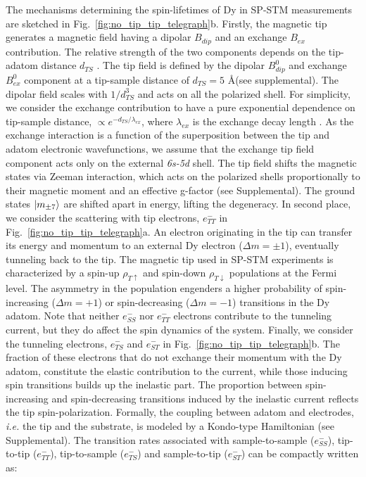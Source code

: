 \documentclass[
reprint,amsmath,amssymb,aps]{revtex4-2}
\begin{document}
The mechanisms determining the spin-lifetimes of Dy in SP-STM measurements are sketched in Fig.~\ref{fig:no_tip_tip_telegraph}b.
Firstly, the magnetic tip generates a magnetic field having a dipolar $B_{dip}$ and an exchange $B_{ex}$ contribution. The relative strength of the two components depends on the tip-adatom distance $d_{TS}$ \cite{willke}. 
The tip field is defined by the dipolar $B^0_{dip}$ and exchange $B^0_{ex}$ component at a tip-sample distance of $d_{TS}=5$ \AA (see supplemental). The dipolar field scales with $1/d_{TS}^3$ and acts on all the polarized shell. For simplicity, we consider the exchange contribution to have a pure exponential dependence on tip-sample distance, $\propto e^{-d_{TS}/\lambda_{ex}}$, where $\lambda_{ex}$ is the exchange decay length \cite{}.
As the exchange interaction is a function of the superposition between the tip and adatom electronic wavefunctions, we assume that the exchange tip field component acts only on the external \textit{6s-5d} shell.
The tip field shifts the magnetic states via Zeeman interaction, which acts on the polarized shells proportionally to their magnetic moment and an effective g-factor (see Supplemental). 
The ground states $\ket{m_{\pm7}}$  are shifted apart in energy, lifting the degeneracy. In second place, we consider the scattering with tip electrons, $e^{-}_{TT}$ in Fig.~\ref{fig:no_tip_tip_telegraph}a. An electron originating in the tip can transfer its energy and momentum to an external Dy electron ($\Delta m=\pm 1$), eventually tunneling back to the tip. The magnetic tip used in SP-STM experiments is characterized by a spin-up $\rho_{T\uparrow}$ and spin-down $\rho_{T\downarrow}$ populations at the Fermi level. The asymmetry in the population engenders a higher probability of spin-increasing ($\Delta m=+1$) or spin-decreasing ($\Delta m=-1$) transitions in the Dy adatom. Note that neither $e^{-}_{SS}$ nor $e^{-}_{TT}$ electrons contribute to the tunneling current, but they do affect the spin dynamics of the system. Finally, we consider the tunneling electrons, $e^{-}_{TS}$ and $e^{-}_{ST}$ in Fig.~\ref{fig:no_tip_tip_telegraph}b. The fraction of these electrons that do not exchange their momentum with the Dy adatom, constitute the elastic contribution to the current, while those inducing spin transitions builds up the inelastic part. The proportion between spin-increasing and spin-decreasing transitions induced by the inelastic current reflects the tip spin-polarization. Formally, the coupling between adatom and electrodes, \textit{i.e.} the tip and the substrate, is modeled by a Kondo-type Hamiltonian \cite{delgado2010} (see Supplemental). The transition rates associated with sample-to-sample ($e^{-}_{SS}$), tip-to-tip ($e^{-}_{TT}$), tip-to-sample ($e^{-}_{TS}$) and sample-to-tip ($e^{-}_{ST}$) can be compactly written as:
\end{document}
